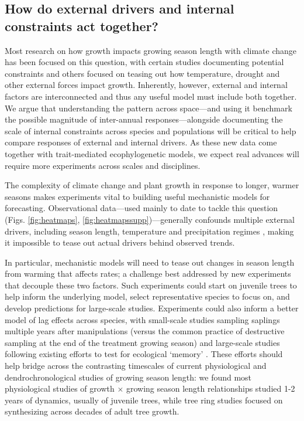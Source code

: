 \documentclass[11pt]{article}
\begin{document}


\subsection*{How do external drivers and internal constraints act together?}

Most research on how growth impacts growing season length with climate change has been focused on this question, with certain studies documenting potential constraints and others focused on teasing out how temperature, drought and other external forces impact growth. Inherently, however, external and internal factors are interconnected and thus any useful model must include both together.  We argue that understanding the pattern across space---and using it benchmark the possible magnitude of inter-annual responses---alongside documenting the scale of internal constraints across species and populations will be critical to help compare responses of external and internal drivers. As these new data come together with trait-mediated ecophylogenetic models, we expect real advances will require more experiments across scales and disciplines.  

The complexity of climate change and plant growth in response to longer, warmer seasons makes experiments vital to building useful mechanistic models for forecasting. Observational data---used mainly to date to tackle this question (Figs. \ref{fig:heatmaps}, \ref{fig:heatmapssupp})---generally confounds multiple external drivers, including season length, temperature and precipitation regimes \citep{ren2019,ipcc2021,camarero2022decoupled}, making it impossible to tease out actual drivers behind observed trends. 

In particular, mechanistic models will need to tease out changes in season length from warming that affects rates; a challenge best addressed by new experiments that decouple these two factors. Such experiments could start on juvenile trees to help inform the underlying model, select representative species to focus on, and  develop predictions for large-scale studies. Experiments could also inform a better model of lag effects across species, with small-scale studies sampling saplings multiple years after manipulations (versus the common practice of destructive sampling at the end of the treatment growing season) and large-scale studies following existing efforts to test for ecological `memory'  \citep[e.g. ][]{flinker2021promise,schweiger2022transgenerational,chinmemory}. These efforts should help bridge across the contrasting timescales of current physiological and dendrochronological studies of growing season length: we found most physiological studies of growth $\times$ growing season length relationships studied 1-2 years of dynamics, usually of juvenile trees, while tree ring studies focused on synthesizing across decades of adult tree growth. 
\end{document}
